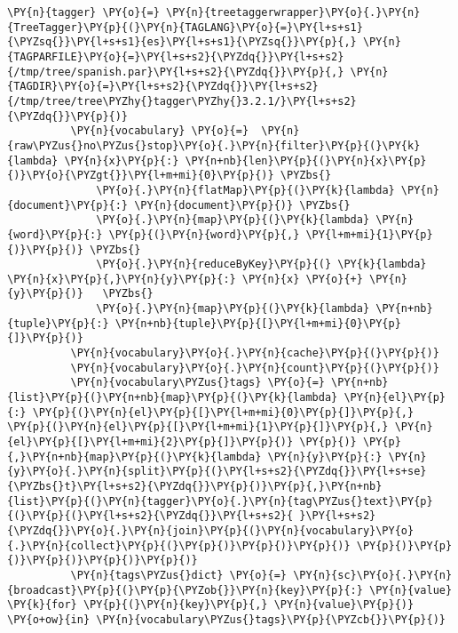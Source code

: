           
\vspace{0.5cm}
          
              \begin{tcolorbox}[breakable, size=fbox, boxrule=1pt, pad at break*=1mm,colback=cellbackground, colframe=cellborder]
          \begin{Verbatim}[commandchars=\\\{\}]
          \PY{n}{tagger} \PY{o}{=} \PY{n}{treetaggerwrapper}\PY{o}{.}\PY{n}{TreeTagger}\PY{p}{(}\PY{n}{TAGLANG}\PY{o}{=}\PY{l+s+s1}{\PYZsq{}}\PY{l+s+s1}{es}\PY{l+s+s1}{\PYZsq{}}\PY{p}{,} \PY{n}{TAGPARFILE}\PY{o}{=}\PY{l+s+s2}{\PYZdq{}}\PY{l+s+s2}{/tmp/tree/spanish.par}\PY{l+s+s2}{\PYZdq{}}\PY{p}{,} \PY{n}{TAGDIR}\PY{o}{=}\PY{l+s+s2}{\PYZdq{}}\PY{l+s+s2}{/tmp/tree/tree\PYZhy{}tagger\PYZhy{}3.2.1/}\PY{l+s+s2}{\PYZdq{}}\PY{p}{)}          
          \PY{n}{vocabulary} \PY{o}{=}  \PY{n}{raw\PYZus{}no\PYZus{}stop}\PY{o}{.}\PY{n}{filter}\PY{p}{(}\PY{k}{lambda} \PY{n}{x}\PY{p}{:} \PY{n+nb}{len}\PY{p}{(}\PY{n}{x}\PY{p}{)}\PY{o}{\PYZgt{}}\PY{l+m+mi}{0}\PY{p}{)} \PYZbs{}
              \PY{o}{.}\PY{n}{flatMap}\PY{p}{(}\PY{k}{lambda} \PY{n}{document}\PY{p}{:} \PY{n}{document}\PY{p}{)} \PYZbs{}
              \PY{o}{.}\PY{n}{map}\PY{p}{(}\PY{k}{lambda} \PY{n}{word}\PY{p}{:} \PY{p}{(}\PY{n}{word}\PY{p}{,} \PY{l+m+mi}{1}\PY{p}{)}\PY{p}{)} \PYZbs{}
              \PY{o}{.}\PY{n}{reduceByKey}\PY{p}{(} \PY{k}{lambda} \PY{n}{x}\PY{p}{,}\PY{n}{y}\PY{p}{:} \PY{n}{x} \PY{o}{+} \PY{n}{y}\PY{p}{)}   \PYZbs{}
              \PY{o}{.}\PY{n}{map}\PY{p}{(}\PY{k}{lambda} \PY{n+nb}{tuple}\PY{p}{:} \PY{n+nb}{tuple}\PY{p}{[}\PY{l+m+mi}{0}\PY{p}{]}\PY{p}{)} 
          \PY{n}{vocabulary}\PY{o}{.}\PY{n}{cache}\PY{p}{(}\PY{p}{)}
          \PY{n}{vocabulary}\PY{o}{.}\PY{n}{count}\PY{p}{(}\PY{p}{)}
          \PY{n}{vocabulary\PYZus{}tags} \PY{o}{=} \PY{n+nb}{list}\PY{p}{(}\PY{n+nb}{map}\PY{p}{(}\PY{k}{lambda} \PY{n}{el}\PY{p}{:} \PY{p}{(}\PY{n}{el}\PY{p}{[}\PY{l+m+mi}{0}\PY{p}{]}\PY{p}{,} \PY{p}{(}\PY{n}{el}\PY{p}{[}\PY{l+m+mi}{1}\PY{p}{]}\PY{p}{,} \PY{n}{el}\PY{p}{[}\PY{l+m+mi}{2}\PY{p}{]}\PY{p}{)} \PY{p}{)} \PY{p}{,}\PY{n+nb}{map}\PY{p}{(}\PY{k}{lambda} \PY{n}{y}\PY{p}{:} \PY{n}{y}\PY{o}{.}\PY{n}{split}\PY{p}{(}\PY{l+s+s2}{\PYZdq{}}\PY{l+s+se}{\PYZbs{}t}\PY{l+s+s2}{\PYZdq{}}\PY{p}{)}\PY{p}{,}\PY{n+nb}{list}\PY{p}{(}\PY{n}{tagger}\PY{o}{.}\PY{n}{tag\PYZus{}text}\PY{p}{(}\PY{p}{(}\PY{l+s+s2}{\PYZdq{}}\PY{l+s+s2}{ }\PY{l+s+s2}{\PYZdq{}}\PY{o}{.}\PY{n}{join}\PY{p}{(}\PY{n}{vocabulary}\PY{o}{.}\PY{n}{collect}\PY{p}{(}\PY{p}{)}\PY{p}{)}\PY{p}{)} \PY{p}{)}\PY{p}{)}\PY{p}{)}\PY{p}{)}\PY{p}{)}
          \PY{n}{tags\PYZus{}dict} \PY{o}{=} \PY{n}{sc}\PY{o}{.}\PY{n}{broadcast}\PY{p}{(}\PY{p}{\PYZob{}}\PY{n}{key}\PY{p}{:} \PY{n}{value} \PY{k}{for} \PY{p}{(}\PY{n}{key}\PY{p}{,} \PY{n}{value}\PY{p}{)} \PY{o+ow}{in} \PY{n}{vocabulary\PYZus{}tags}\PY{p}{\PYZcb{}}\PY{p}{)}
          \end{Verbatim}
          \end{tcolorbox}
          
